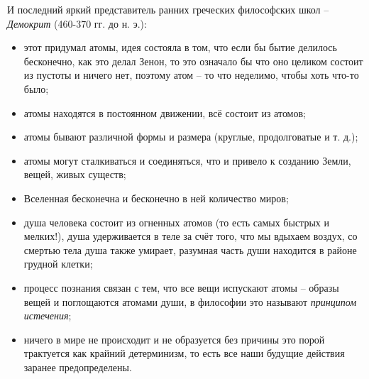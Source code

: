 И последний яркий представитель ранних греческих философских школ -- \textit{Демокрит} (460-370 гг. до н. э.):
\begin{itemize}
	\item этот придумал атомы, идея состояла в том, что если бы бытие делилось бесконечно, как это делал Зенон, то это означало бы что оно целиком состоит из пустоты и ничего нет, поэтому атом -- то что неделимо, чтобы хоть что-то было; 
	\item атомы находятся в постоянном движении, всё состоит из атомов;
	\item атомы бывают различной формы и размера (круглые, продолговатые и т. д.);
	\item атомы могут сталкиваться и соединяться, что и привело к созданию Земли, вещей, живых существ;
	\item Вселенная бесконечна и бесконечно в ней количество миров;
	\item душа человека состоит из огненных атомов (то есть самых быстрых и мелких!), душа удерживается в теле за счёт того, что мы вдыхаем воздух, со смертью тела душа также умирает, разумная часть души находится в районе грудной клетки;
	\item процесс познания связан с тем, что все вещи испускают атомы -- образы вещей и поглощаются атомами души, в философии это называют \textit{принципом истечения};
	\item ничего в мире не происходит и не образуется без причины это порой трактуется как крайний детерминизм, то есть все наши будущие действия заранее предопределены.
\end{itemize}
